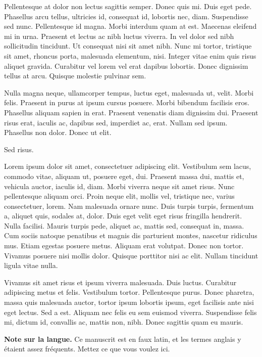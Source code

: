 \documentclass[../hdr.tex]{subfiles}
\begin{document}
Pellentesque at dolor non lectus sagittis semper. Donec quis mi. Duis eget pede.
Phasellus arcu tellus, ultricies id, consequat id, lobortis nec, diam.
Suspendisse sed nunc. Pellentesque id magna. Morbi interdum quam at est.
Maecenas eleifend mi in urna. Praesent et lectus ac nibh luctus viverra. In vel
dolor sed nibh sollicitudin tincidunt. Ut consequat nisi sit amet nibh. Nunc mi
tortor, tristique sit amet, rhoncus porta, malesuada elementum, nisi. Integer
vitae enim quis risus aliquet gravida. Curabitur vel lorem vel erat dapibus
lobortis. Donec dignissim tellus at arcu. Quisque molestie pulvinar sem.

Nulla magna neque, ullamcorper tempus, luctus eget, malesuada ut, velit. Morbi
felis. Praesent in purus at ipsum cursus posuere. Morbi bibendum facilisis eros.
Phasellus aliquam sapien in erat. Praesent venenatis diam dignissim dui.
Praesent risus erat, iaculis ac, dapibus sed, imperdiet ac, erat. Nullam sed
ipsum. Phasellus non dolor. Donec ut elit.

Sed risus.

Lorem ipsum dolor sit amet, consectetuer adipiscing elit. Vestibulum sem lacus,
commodo vitae, aliquam ut, posuere eget, dui. Praesent massa dui, mattis et,
vehicula auctor, iaculis id, diam. Morbi viverra neque sit amet risus. Nunc
pellentesque aliquam orci. Proin neque elit, mollis vel, tristique nec, varius
consectetuer, lorem. Nam malesuada ornare nunc. Duis turpis turpis, fermentum a,
aliquet quis, sodales at, dolor. Duis eget velit eget risus fringilla hendrerit.
Nulla facilisi. Mauris turpis pede, aliquet ac, mattis sed, consequat in, massa.
Cum sociis natoque penatibus et magnis dis parturient montes, nascetur ridiculus
mus. Etiam egestas posuere metus. Aliquam erat volutpat. Donec non tortor.
Vivamus posuere nisi mollis dolor. Quisque porttitor nisi ac elit. Nullam
tincidunt ligula vitae nulla.

Vivamus sit amet risus et ipsum viverra malesuada. Duis luctus. Curabitur
adipiscing metus et felis. Vestibulum tortor. Pellentesque purus. Donec
pharetra, massa quis malesuada auctor, tortor ipsum lobortis ipsum, eget
facilisis ante nisi eget lectus. Sed a est. Aliquam nec felis eu sem euismod
viverra. Suspendisse felis mi, dictum id, convallis ac, mattis non, nibh. Donec
sagittis quam eu mauris. 


\vskip2cm

\begin{encadre}

  \textbf{Note sur la langue.} Ce manuscrit est en faux latin, et les termes
  anglais y étaient assez fréquents. Mettez ce que vous voulez ici.

\end{encadre}

\ifSubfilesClassLoaded{%
\printbibliography
}{%
  \vskip2cm
}
\end{document}
